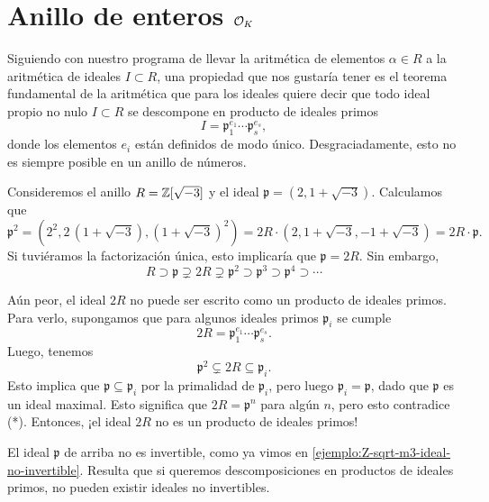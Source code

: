\section{Anillo de enteros \texorpdfstring{$\mathcal{O}_K$}{O\_K}}

Siguiendo con nuestro programa de llevar la aritmética de elementos
$\alpha \in R$ a la aritmética de ideales $I \subset R$, una propiedad que nos
gustaría tener es el teorema fundamental de la aritmética que para los ideales
quiere decir que todo ideal propio no nulo $I \subset R$ se descompone en
producto de ideales primos
$$I = \mathfrak{p}_1^{e_1}\cdots \mathfrak{p}_s^{e_s},$$
donde los elementos $e_i$ están definidos de modo único.
Desgraciadamente, esto no es siempre posible en un anillo de números.

\begin{ejemplo}
  Consideremos el anillo $R = \mathbb{Z} [\sqrt{-3}]$ y el ideal
  $\mathfrak{p} = (2, 1+\sqrt{-3})$.  Calculamos que
  \[ \mathfrak{p}^2 = (2^2, 2\,(1+\sqrt{-3}), (1 + \sqrt{-3})^2) =
     2R\cdot (2, 1+\sqrt{-3}, -1 + \sqrt{-3}) = 2R\cdot \mathfrak{p}. \]
  Si tuviéramos la factorización única, esto implicaría que $\mathfrak{p} = 2R$.
  Sin embargo,
  \[ \tag{*} R \supset \mathfrak{p} \supsetneq 2R \supsetneq \mathfrak{p}^2
     \supset \mathfrak{p}^3 \supset \mathfrak{p}^4 \supset \cdots \]
 
  Aún peor, el ideal $2R$ no puede ser escrito como un producto de ideales
  primos. Para verlo, supongamos que para algunos ideales primos $\mathfrak{p}_i$
  se cumple
  $$2R = \mathfrak{p}_1^{e_1} \cdots \mathfrak{p}_s^{e_s}.$$
  Luego, tenemos
  $$\mathfrak{p}^2 \subsetneq 2R \subseteq \mathfrak{p}_i.$$
  Esto implica que $\mathfrak{p} \subseteq \mathfrak{p}_i$ por la primalidad de
  $\mathfrak{p}_i$, pero luego $\mathfrak{p}_i = \mathfrak{p}$, dado que
  $\mathfrak{p}$ es un ideal maximal. Esto significa que $2R = \mathfrak{p}^n$
  para algún $n$, pero esto contradice (*). Entonces, ¡el ideal $2R$ no es un
  producto de ideales primos!
\end{ejemplo}

El ideal $\mathfrak{p}$ de arriba no es invertible, como ya vimos en
\ref{ejemplo:Z-sqrt-m3-ideal-no-invertible}. Resulta que si queremos
descomposiciones en productos de ideales primos, no pueden existir ideales no
invertibles.

